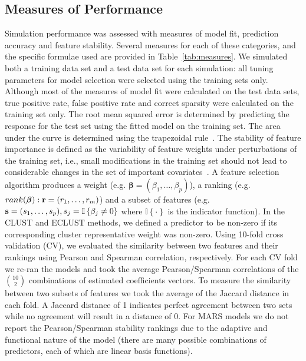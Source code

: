 \subsection{Measures of Performance}
Simulation performance was assessed with measures of model fit, prediction accuracy and feature stability. Several measures for each of these categories, and the specific formulae used are provided in Table~\ref{tab:measures}. We simulated both a training data set and a test data set for each simulation: all tuning parameters for  model selection were selected using the training sets only.  Although most of the measures of model fit were calculated on the test data sets, true positive rate, false positive rate and correct sparsity were calculated on the training set only. The root mean squared error is determined by predicting the response for the test set using the fitted model on the training set. The area under the curve is determined using the trapezoidal rule~\citep{auc}. The stability of feature importance is defined as the variability of feature weights under perturbations of the training set, i.e., small modifications in the training set should not lead to considerable changes in the set of important covariates~\citep{tolocsi2011classification}. A feature selection algorithm produces a weight (e.g. $\boldsymbol{\beta}= (\beta_1, \ldots, \beta_p)$), a ranking (e.g. $rank(\boldsymbol{\beta}):\mathbf{r} = (r_1, \ldots, r_m)$) and a subset of features (e.g. $\mathbf{s}=(s_1,\ldots, s_p), s_j = \mathbb{I}\left\lbrace\beta_j\neq 0 \right\rbrace$ where $\mathbb{I}\left\lbrace \cdot\right\rbrace$ is the indicator function). 
In the CLUST and ECLUST methods, we defined a predictor to be non-zero if its corresponding cluster representative weight was non-zero. Using 10-fold cross validation (CV), we evaluated the similarity between two features and their rankings using Pearson and Spearman correlation, respectively. For each CV fold we re-ran the models and took the average Pearson/Spearman correlations of the $\binom{10}{2}$ combinations of estimated coefficients vectors. To measure the similarity between two subsets of features we took the average of the Jaccard distance in each fold. A Jaccard distance of 1 indicates perfect agreement between two sets while no agreement will result in a distance of 0. For MARS models we do not report the Pearson/Spearman stability rankings due to the adaptive and functional nature of the model (there are many possible combinations of predictors, each of which are linear basis functions). 


